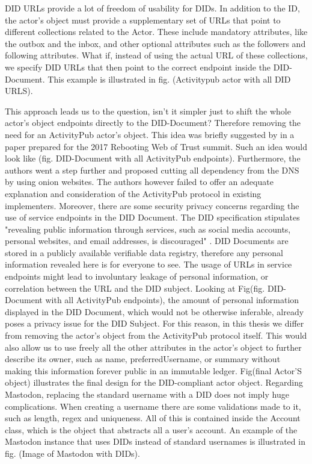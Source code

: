 DID URLs provide a lot of freedom of usability for DIDs. In addition to the ID, the actor’s object must provide a supplementary set of URLs that point to different collections related to the Actor. These include mandatory attributes, like the outbox and the inbox, and other optional attributes such as the followers and following attributes. What if, instead of using the actual URL of these collections, we specify DID URLs that then point to the correct endpoint inside the DID-Document. This example is illustrated in fig. (Activitypub actor with all DID URLS). 


This approach leads us to the question, isn’t it simpler just to shift the whole actor’s object endpoints directly to the DID-Document? Therefore removing the need for an ActivityPub actor’s object. This idea was briefly suggested by \cite{webber_sporny_2017} in a paper prepared for the 2017 Rebooting Web of Trust summit. Such an idea would look like (fig. DID-Document with all ActivityPub endpoints). Furthermore, the authors went a step further and proposed cutting all dependency from the DNS by using onion websites. The authors however failed to offer an adequate explanation and consideration of the ActivityPub protocol in existing implementers. Moreover, there are some security privacy concerns regarding the use of service endpoints in the DID Document. The DID specification stipulates "revealing public information through services, such as social media accounts, personal websites, and email addresses, is discouraged" \cite{sporny_longley_sabadello_reed_steele_2021}. DID Documents are stored in a publicly available verifiable data registry, therefore any personal information revealed here is for everyone to see. The usage of URLs in service endpoints might lead to involuntary leakage of personal information, or correlation between the URL and the DID subject. Looking at Fig(fig. DID-Document with all ActivityPub endpoints), the amount of personal information displayed in the DID Document, which would not be otherwise inferable, already poses a privacy issue for the DID Subject. For this reason, in this thesis we differ from removing the actor’s object from the ActivityPub protocol itself. This would also allow us to use freely all the other attributes in the actor’s object to further describe its owner, such as name, preferredUsername, or summary without making this information forever public in an immutable ledger. Fig(final Actor’S object) illustrates the final design for the DID-compliant actor object. 
Regarding Mastodon, replacing the standard username with a DID does not imply huge complications. When creating a username there are some validations made to it, such as length, regex and uniqueness. All of this is contained inside the Account class, which is the object that abstracts all a user’s account. An example of the Mastodon instance that uses DIDs instead of standard usernames is illustrated in fig. (Image of Mastodon with DIDs). 



